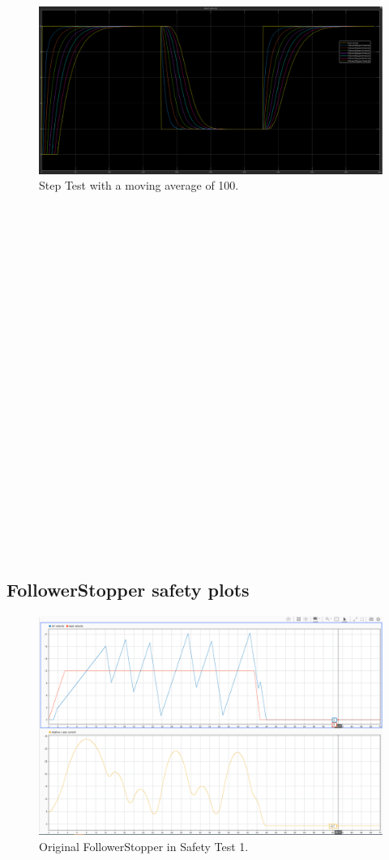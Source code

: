 \documentclass[conference]{IEEEtran}
\begin{document}
\begin{appendix}
\begin{figure}[htbp!]
\centerline{\includegraphics[width=6.50 in]{multiFS_velbad_ma100.PNG}}
\caption{Step Test with a moving average of 100.}
\label{ma100}
\end{figure}

\begin{verbatim}























\end{verbatim}
\pagebreak
\subsection{FollowerStopper safety plots}

\begin{figure}[htbp]
\centerline{\includegraphics[width=5.71 in]{oldFS_safety1.PNG}}
\caption{Original FollowerStopper in Safety Test 1.}
\label{oldsafe1}
\end{figure}


\end{appendix}
\end{document}
